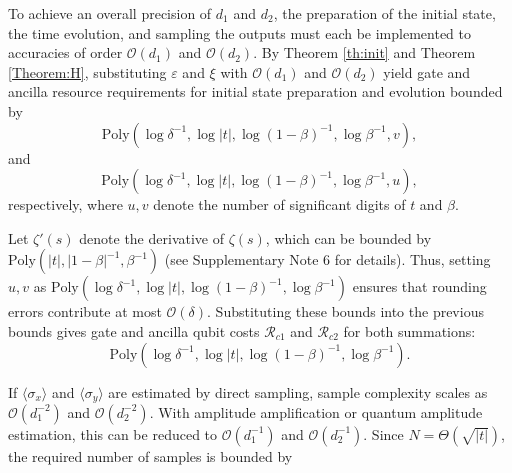 \documentclass[aps,pra,twocolumn,superscriptaddress,preprintnumbers,amsmath,amssymb]{revtex4-2}
\begin{document}
To achieve an overall precision of $d_1$ and $d_2$, the preparation of the initial state, the time evolution, and sampling the outputs must each be implemented to accuracies of order $\mathcal{O}(d_1)$ and $\mathcal{O}(d_2)$. By Theorem \ref{th:init} and Theorem \ref{Theorem:H}, substituting $\varepsilon$ and $\xi$ with $\mathcal{O}(d_1)$ and $\mathcal{O}(d_2)$ yield gate and ancilla resource requirements for initial state preparation and evolution  bounded by 
\begin{equation}
         \mathrm{Poly}(\log\delta^{-1},\log|t|,\log(1-\beta)^{-1},\log\beta^{-1},v),
\end{equation}
and 
\begin{equation}
\mathrm{Poly}(\log\delta^{-1},\log|t|,\log(1-\beta)^{-1},\log\beta^{-1},u),
\end{equation}
respectively, where $u,v$ denote the number of significant digits of $t$ and $\beta$. \par
Let  $\zeta'(s)$  denote the derivative of $\zeta(s)$, which can be bounded by
    $\mathrm{Poly}(|t|,|1-\beta|^{-1},\beta^{-1})$ (see Supplementary Note 6 for details). Thus, setting $u,v$  as $\mathrm{Poly}(\log\delta^{-1},\log|t|,\log(1-\beta)^{-1},\log\beta^{-1})$
ensures that rounding errors contribute at most $\mathcal{O}(\delta)$. Substituting these bounds into the previous bounds gives gate  and ancilla qubit costs $\mathcal{R}_{c1}$ and $\mathcal{R}_{c2}$ for both summations:
\begin{equation}\label{eq:initial complexity2}
\mathrm{Poly}(\log\delta^{-1},\log|t|,\log(1-\beta)^{-1},\log\beta^{-1}).
\end{equation}\par
If  $\langle\sigma_x\rangle$  and $\langle \sigma_y \rangle$ are estimated by direct sampling, sample complexity scales as $\mathcal{O}(d_1^{-2})$ and $\mathcal{O}(d_2^{-2})$. With amplitude amplification or quantum amplitude estimation, this can be reduced to $\mathcal{O}(d_1^{-1})$ and $\mathcal{O}(d_2^{-1})$. Since $N=\Theta(\sqrt{|t|})$, the required number of samples is bounded by
\end{document}
